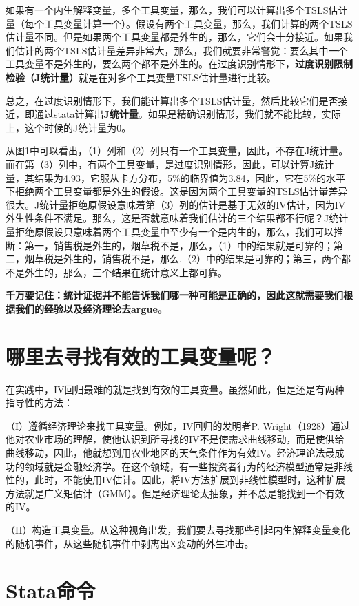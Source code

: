 \documentclass[cn,10pt,math=newtx,citestyle=gb7714-2015,bibstyle=gb7714-2015]{elegantbook}
\begin{document}
	如果有一个内生解释变量，多个工具变量，那么，我们可以计算出多个TSLS估计量（每个工具变量计算一个）。假设有两个工具变量，那么，我们计算的两个TSLS估计量不同。但是如果两个工具变量都是外生的，那么，它们会十分接近。如果我们估计的两个TSLS估计量差异非常大，那么，我们就要非常警觉：要么其中一个工具变量不是外生的，要么两个都不是外生的。在过度识别情形下，\textbf{过度识别限制检验（J统计量）}就是在对多个工具变量TSLS估计量进行比较。
	
	总之，在过度识别情形下，我们能计算出多个TSLS估计量，然后比较它们是否接近，即通过stata计算出\textbf{J统计量}。如果是精确识别情形，我们就不能比较，实际上，这个时候的J统计量为0。
	
	从图1中可以看出，（1）列和（2）列只有一个工具变量，因此，不存在J统计量。而在第（3）列中，有两个工具变量，是过度识别情形，因此，可以计算J统计量，其结果为4.93，它服从卡方分布，5\%的临界值为3.84，因此，它在5\%的水平下拒绝两个工具变量都是外生的假设。这是因为两个工具变量的TSLS估计量差异很大。J统计量拒绝原假设意味着第（3）列的估计是基于无效的IV估计，因为IV外生性条件不满足。那么，这是否就意味着我们估计的三个结果都不行呢？J统计量拒绝原假设只意味着两个工具变量中至少有一个是内生的，那么，我们可以推断：第一，销售税是外生的，烟草税不是，那么，（1）中的结果就是可靠的；第二，烟草税是外生的，销售税不是，那么,（2）中的结果是可靠的；第三，两个都不是外生的，那么，三个结果在统计意义上都可靠。
	
	\textbf{千万要记住：统计证据并不能告诉我们哪一种可能是正确的，因此这就需要我们根据我们的经验以及经济理论去argue。}
	
	\section{哪里去寻找有效的工具变量呢？}
	
	在实践中，IV回归最难的就是找到有效的工具变量。虽然如此，但是还是有两种指导性的方法：
	
	（I）遵循经济理论来找工具变量。例如，IV回归的发明者P. Wright（1928）通过他对农业市场的理解，使他认识到所寻找的IV不是使需求曲线移动，而是使供给曲线移动，因此，他就想到用农业地区的天气条件作为有效IV。经济理论法最成功的领域就是金融经济学。在这个领域，有一些投资者行为的经济模型通常是非线性的，此时，不能使用IV估计。因此，将IV方法扩展到非线性模型时，这种扩展方法就是广义矩估计（GMM）。但是经济理论太抽象，并不总是能找到一个有效的IV。
	
	（II）构造工具变量。从这种视角出发，我们要去寻找那些引起内生解释变量变化的随机事件，从这些随机事件中剥离出X变动的外生冲击。
	
	
	\section{Stata命令}
	
\end{document}
